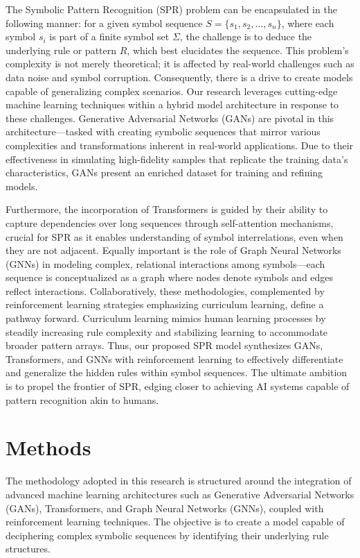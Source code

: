 \documentclass{article}
\begin{document}
The Symbolic Pattern Recognition (SPR) problem can be encapsulated in the following manner: for a given symbol sequence \( S = \{ s_1, s_2, \ldots, s_n \} \), where each symbol \( s_i \) is part of a finite symbol set \(\Sigma\), the challenge is to deduce the underlying rule or pattern \( R \), which best elucidates the sequence. This problem's complexity is not merely theoretical; it is affected by real-world challenges such as data noise and symbol corruption. Consequently, there is a drive to create models capable of generalizing complex scenarios. Our research leverages cutting-edge machine learning techniques within a hybrid model architecture in response to these challenges. Generative Adversarial Networks (GANs) are pivotal in this architecture—tasked with creating symbolic sequences that mirror various complexities and transformations inherent in real-world applications. Due to their effectiveness in simulating high-fidelity samples that replicate the training data's characteristics, GANs present an enriched dataset for training and refining models.

Furthermore, the incorporation of Transformers is guided by their ability to capture dependencies over long sequences through self-attention mechanisms, crucial for SPR as it enables understanding of symbol interrelations, even when they are not adjacent. Equally important is the role of Graph Neural Networks (GNNs) in modeling complex, relational interactions among symbols—each sequence is conceptualized as a graph where nodes denote symbols and edges reflect interactions. Collaboratively, these methodologies, complemented by reinforcement learning strategies emphasizing curriculum learning, define a pathway forward. Curriculum learning mimics human learning processes by steadily increasing rule complexity and stabilizing learning to accommodate broader pattern arrays. Thus, our proposed SPR model synthesizes GANs, Transformers, and GNNs with reinforcement learning to effectively differentiate and generalize the hidden rules within symbol sequences. The ultimate ambition is to propel the frontier of SPR, edging closer to achieving AI systems capable of pattern recognition akin to humans.
\section{Methods}
The methodology adopted in this research is structured around the integration of advanced machine learning architectures such as Generative Adversarial Networks (GANs), Transformers, and Graph Neural Networks (GNNs), coupled with reinforcement learning techniques. The objective is to create a model capable of deciphering complex symbolic sequences by identifying their underlying rule structures.
\end{document}
